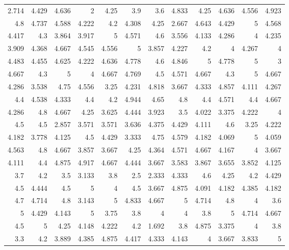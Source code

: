 \documentclass[10pt]{report}
\begin{document}
\begin{table}[!htpb]
\begin{tabular}{rrrrrrrrrrrr}
	2.714 & 4.429 & 4.636 & 2     & 4.25  & 3.9   & 3.6   & 4.833 & 4.25  & 4.636 & 4.556 & 4.923 \\
	4.8   & 4.737 & 4.588 & 4.222 & 4.2   & 4.308 & 4.25  & 2.667 & 4.643 & 4.429 & 5     & 4.568 \\
	4.417 & 4.3   & 3.864 & 3.917 & 5     & 4.571 & 4.6   & 3.556 & 4.133 & 4.286 & 4     & 4.235 \\
	3.909 & 4.368 & 4.667 & 4.545 & 4.556 & 5     & 3.857 & 4.227 & 4.2   & 4     & 4.267 & 4     \\
	4.483 & 4.455 & 4.625 & 4.222 & 4.636 & 4.778 & 4.6   & 4.846 & 5     & 4.778 & 5     & 3     \\
	4.667 & 4.3   & 5     & 4     & 4.667 & 4.769 & 4.5   & 4.571 & 4.667 & 4.3   & 5     & 4.667 \\
	4.286 & 3.538 & 4.75  & 4.556 & 3.25  & 4.231 & 4.818 & 3.667 & 4.333 & 4.857 & 4.111 & 4.267 \\
	4.4   & 4.538 & 4.333 & 4.4   & 4.2   & 4.944 & 4.65  & 4.8   & 4.4   & 4.571 & 4.4   & 4.667 \\
	4.286 & 4.8   & 4.667 & 4.25  & 3.625 & 4.444 & 3.923 & 3.5   & 4.022 & 3.375 & 4.222 & 4     \\
	4.5   & 4.5   & 2.857 & 3.571 & 3.571 & 3.636 & 4.375 & 4.429 & 4.111 & 4.6   & 3.25  & 4.222 \\
	4.182 & 3.778 & 4.125 & 4.5   & 4.429 & 3.333 & 4.75  & 4.579 & 4.182 & 4.069 & 5     & 4.059 \\
	4.563 & 4.8   & 4.667 & 3.857 & 3.667 & 4.25  & 4.364 & 4.571 & 4.667 & 4.167 & 4     & 3.667 \\
	4.111 & 4.4   & 4.875 & 4.917 & 4.667 & 4.444 & 3.667 & 3.583 & 3.867 & 3.655 & 3.852 & 4.125 \\
	3.7   & 4.2   & 3.5   & 3.133 & 3.8   & 2.5   & 2.333 & 4.333 & 4.6   & 4.25  & 4.2   & 4.429 \\
	4.5   & 4.444 & 4.5   & 5     & 4     & 4.5   & 3.667 & 4.875 & 4.091 & 4.182 & 4.385 & 4.182 \\
	4.7   & 4.714 & 4.8   & 3.143 & 5     & 4.833 & 4.667 & 5     & 4.714 & 4.8   & 4     & 3.6   \\
	5     & 4.429 & 4.143 & 5     & 3.75  & 3.8   & 4     & 4     & 3.8   & 5     & 4.714 & 4.667 \\
	4.5   & 5     & 4.25  & 4.148 & 4.222 & 4.2   & 1.692 & 3.8   & 4.875 & 3.375 & 4     & 3.8   \\
	3.3   & 4.2   & 3.889 & 4.385 & 4.875 & 4.417 & 4.333 & 4.143 & 4     & 3.667 & 3.833 & 5     \\

\end{tabular}
\end{table}
\end{document}
